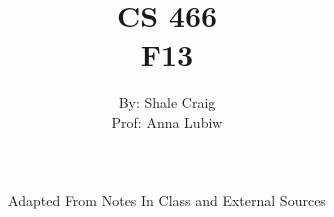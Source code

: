 \ifdefined\isphone
  
\else
  
\fi

\usepackage{listings}
\usepackage[usenames,dvipsnames]{color}

\newcommand{\appr}{\textsc{approx}\xspace}
\newcommand{\ptas}{\textsc{ptas}\xspace}
\newcommand{\fptas}{\textsc{fptas}\xspace}
\newcommand{\npcomplete}{\textsc{NP-complete}\xspace}
\newcommand{\np}{\textsc{NP}\xspace}
\newcommand{\nphard}{\textsc{NP-hard}\xspace}
\newcommand{\open}{\textsc{open}\xspace}
\newcommand{\opt}{\textsc{opt}\xspace}
\newcommand{\p}{\textsc{P}\xspace}

\providecommand{\myceil}[1]{\left \lceil #1 \right \rceil }
\providecommand{\myfloor}[1]{\left \lfloor #1 \right \rfloor }
\newcommand{\Thm}{\textbf{Theorem}\xspace}
\newcommand{\Prf}{\textbf{Proof}\xspace}


\title{CS 466 \\
F13}

\author{By: Shale Craig \\
Prof: Anna Lubiw \\
\\ \\ \\
Adapted From Notes In Class and External Sources}

\lstset{language=Python} %


    \maketitle

    \tableofcontents

    \mainmatter

